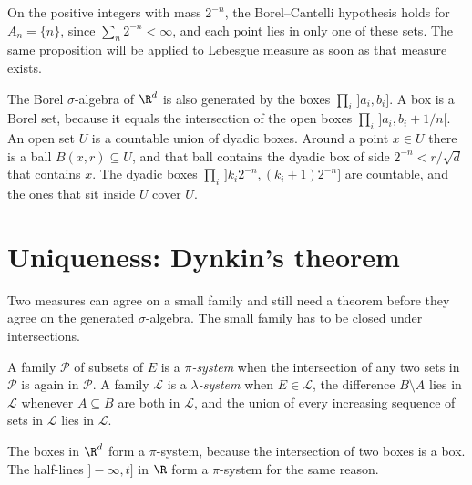 On the positive integers with mass $2^{-n}$, the Borel--Cantelli hypothesis holds for $A_n=\{n\}$, since $\sum_n 2^{-n}<\infty$, and each point lies in only one of these sets.
The same proposition will be applied to Lebesgue measure as soon as that measure exists.

The Borel $\sigma$-algebra of $\R^d$ is also generated by the boxes $\prod_i\,]a_i,b_i]$.
A box is a Borel set, because it equals the intersection of the open boxes $\prod_i\,]a_i,b_i+1/n[$.
An open set $U$ is a countable union of dyadic boxes.
Around a point $x\in U$ there is a ball $B(x,r)\subseteq U$, and that ball contains the dyadic box of side $2^{-n}<r/\sqrt d$ that contains $x$.
The dyadic boxes $\prod_i\,]k_i2^{-n},(k_i+1)2^{-n}]$ are countable, and the ones that sit inside $U$ cover $U$.

\section{Uniqueness: Dynkin's theorem}

Two measures can agree on a small family and still need a theorem before they agree on the generated $\sigma$-algebra.
The small family has to be closed under intersections.

\begin{definition}
A family $\mathcal P$ of subsets of $E$ is a \emph{$\pi$-system} when the intersection of any two sets in $\mathcal P$ is again in $\mathcal P$.
A family $\mathcal L$ is a \emph{$\lambda$-system} when $E\in\mathcal L$, the difference $B\setminus A$ lies in $\mathcal L$ whenever $A\subseteq B$ are both in $\mathcal L$, and the union of every increasing sequence of sets in $\mathcal L$ lies in $\mathcal L$.
\end{definition}

The boxes in $\R^d$ form a $\pi$-system, because the intersection of two boxes is a box.
The half-lines $]-\infty,t]$ in $\R$ form a $\pi$-system for the same reason.

